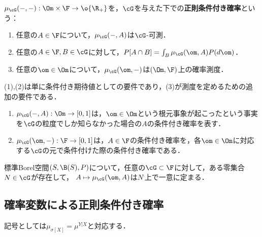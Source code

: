 \documentclass[uplatex,dvipdfmx]{jsreport}
\begin{document}
\begin{definition}
    $\mu_\cG(-,-):\Om\times\F\to\o{\R_+}$を，$\cG$を与えた下での\textbf{正則条件付き確率}という：
    \begin{enumerate}
        \item 任意の$A\in\F$について，$\mu_\cG(-,A)$は$\cG$-可測．
        \item 任意の$A\in\F,B\in\cG$に対して，$P[A\cap B]=\int_B\mu_\cG(\om,A)P(d\om)$．
        \item 任意の$\om\in\Om$について，$\mu_\cG(\om,-)$は$(\Om,\F)$上の確率測度．
    \end{enumerate}
\end{definition}
\begin{remarks}
    (1),(2)は単に条件付き期待値としての要件であり，(3)が測度を定めるための追加の要件である．
    \begin{enumerate}
        \item $\mu_\cG(-,A):\Om\to[0,1]$は，$\om\in\Om$という根元事象が起こったという事実を$\cG$の粒度でしか知らなかった場合の$A$の条件付き確率を表す．
        \item $\mu_\cG(\om,-):\F\to[0,1]$は，$A\in\F$の条件付き確率を，各$\om\in\Om$に対応する$\cG$の元で条件付けた際の条件付き確率である．
    \end{enumerate}
\end{remarks}

\begin{theorem}[正則条件付き確率の存在]
    標準Borel空間$(S,\B(S),P)$について，任意の$\cG\subset\F$に対して，ある零集合$N\in\cG$が存在して，
    $A\mapsto\mu_\cG(\om,A)$は$N^\comp$上で一意に定まる．
\end{theorem}

\subsection{確率変数による正則条件付き確率}

\begin{tcolorbox}[colframe=ForestGreen, colback=ForestGreen!10!white,breakable,colbacktitle=ForestGreen!40!white,coltitle=black,fonttitle=\bfseries\sffamily,
title=]
    記号としては$\mu_{\sigma[X]}=\mu^{Y|X}$と対応する．
\end{tcolorbox}
\end{document}
